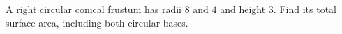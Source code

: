 A right circular conical frustum has radii $8$ and $4$ and height $3$. Find its total surface area, including both circular bases.
